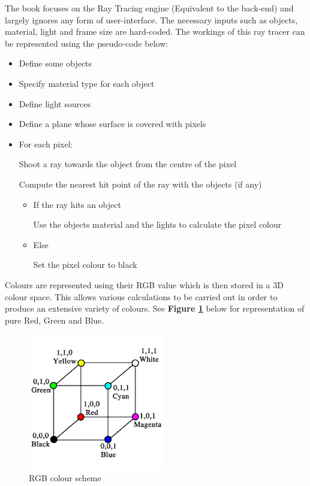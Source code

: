 \documentclass[a4paper]{report}
\begin{document}
	\par The book focuses on the Ray Tracing engine (Equivalent to the back-end) and largely ignores any form of user-interface. The necessary inputs such as objects, material, light and frame size are hard-coded. The workings of this ray tracer can be represented using the pseudo-code below:\\
	\begin{itemize}
		\item Define some objects
		\item Specify material type for each object
		\item Define light sources
		\item Define a plane whose surface is covered with pixels
		\item  For each pixel:
		\par   Shoot a ray towards the object from the centre of the pixel
		\par Compute the nearest hit point of the ray with the objects (if any)
		\begin{itemize}
			\item If the ray hits an object
			\par Use the objects material and the lights to calculate the pixel colour
			\item Else
			\par Set the pixel colour to black
			
		\end{itemize}
	\end{itemize}
	
	\par Colours are represented using their RGB value which is then stored in a 3D colour space. This allows various calculations to be carried out in order to produce an extensive variety of colours. See \textbf{Figure \ref{fig:colour}} below for representation of pure Red, Green and Blue.
	
	\begin{figure}[ht!]
		\centering
		\includegraphics[scale=0.60]{./colour.png}
		\caption{RGB colour scheme}
		\label{fig:colour}
	\end{figure}
	
\end{document}

